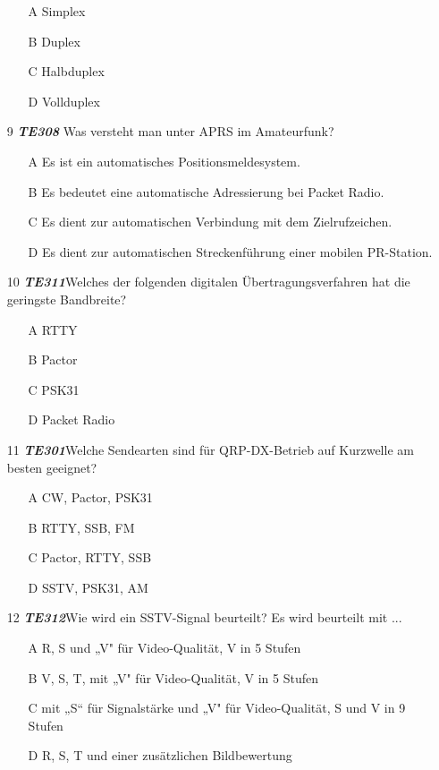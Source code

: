 \begin{enumerate}
\begin{enumerate}
		\item[A] Simplex
		\item[B] Duplex 
		\item[C] Halbduplex
		\item[D] Vollduplex
		\end{enumerate} 
	\item[9] \emph{\textbf{TE308}} Was versteht man unter APRS im Amateurfunk?
	\begin{enumerate}
	\itemsep1pt\parskip0pt
		\item[A] Es ist ein automatisches Positionsmeldesystem.
		\item[B] Es bedeutet eine automatische Adressierung bei Packet Radio.
		\item[C] Es dient zur automatischen Verbindung mit dem Zielrufzeichen.
		\item[D] Es dient zur automatischen Streckenführung einer mobilen PR-Station.
		\end{enumerate} 
	\item[10] \emph{\textbf{TE311}}Welches der folgenden digitalen Übertragungsverfahren hat die geringste Bandbreite?
	\begin{enumerate}
	\itemsep1pt\parskip0pt
		\item[A] RTTY
		\item[B] Pactor
		\item[C] PSK31
		\item[D] Packet Radio
		\end{enumerate} 
	\item[11] \emph{\textbf{TE301}}Welche Sendearten sind für QRP-DX-Betrieb auf Kurzwelle am besten geeignet?
	\begin{enumerate}
	\itemsep1pt\parskip0pt
		\item[A] CW, Pactor, PSK31
		\item[B] RTTY, SSB, FM
		\item[C] Pactor, RTTY, SSB
		\item[D] SSTV, PSK31, AM
		\end{enumerate} 
	\item[12] \emph{\textbf{TE312}}Wie wird ein SSTV-Signal beurteilt? Es wird beurteilt mit ...
	\begin{enumerate}
	\itemsep1pt\parskip0pt
		\item[A] R, S und „V" für Video-Qualität, V in 5 Stufen
		\item[B] V, S, T, mit „V" für Video-Qualität, V in 5 Stufen
		\item[C] mit „S“ für Signalstärke und „V" für Video-Qualität, S und V in 9 Stufen
		\item[D] R, S, T und einer zusätzlichen Bildbewertung
		\end{enumerate} 
\end{enumerate}




